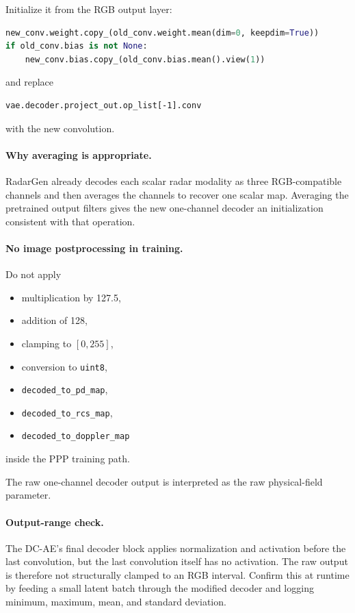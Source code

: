 \documentclass[11pt,a4paper]{article}
\begin{document}
Initialize it from the RGB output layer:
\begin{lstlisting}[language=Python]
new_conv.weight.copy_(old_conv.weight.mean(dim=0, keepdim=True))
if old_conv.bias is not None:
    new_conv.bias.copy_(old_conv.bias.mean().view(1))
\end{lstlisting}
and replace
\begin{lstlisting}
vae.decoder.project_out.op_list[-1].conv
\end{lstlisting}
with the new convolution.

\paragraph{Why averaging is appropriate.}
RadarGen already decodes each scalar radar modality as three RGB-compatible channels and then averages the channels to recover one scalar map. Averaging the pretrained output filters gives the new one-channel decoder an initialization consistent with that operation.

\paragraph{No image postprocessing in training.}
Do not apply
\begin{itemize}
    \item multiplication by 127.5,
    \item addition of 128,
    \item clamping to \([0,255]\),
    \item conversion to \texttt{uint8},
    \item \texttt{decoded\_to\_pd\_map},
    \item \texttt{decoded\_to\_rcs\_map},
    \item \texttt{decoded\_to\_doppler\_map}
\end{itemize}
inside the PPP training path.

The raw one-channel decoder output is interpreted as the raw physical-field parameter.

\paragraph{Output-range check.}
The DC-AE's final decoder block applies normalization and activation before the last convolution, but the last convolution itself has no activation. The raw output is therefore not structurally clamped to an RGB interval. Confirm this at runtime by feeding a small latent batch through the modified decoder and logging minimum, maximum, mean, and standard deviation.
\end{document}
